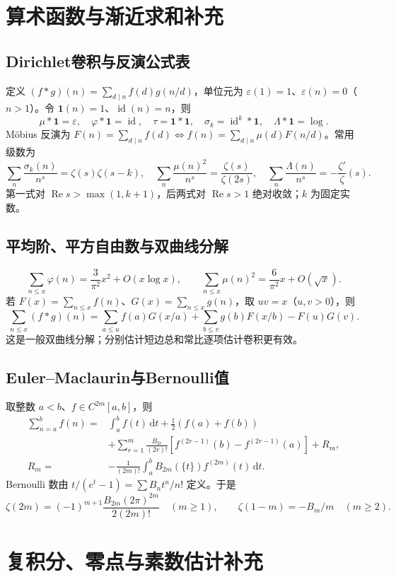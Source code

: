 \documentclass[../main.tex]{subfiles}
\begin{document}
\section{算术函数与渐近求和补充}
\subsection{Dirichlet卷积与反演公式表}
定义 $(f*g)(n)=\sum_{d\mid n}f(d)g(n/d)$，单位元为 $\varepsilon(1)=1$、$\varepsilon(n)=0$（$n>1$）。令 $\mathbf1(n)=1$、$\operatorname{id}(n)=n$，则
\[
\mu*\mathbf1=\varepsilon,\quad\varphi*\mathbf1=\operatorname{id},\quad
\tau=\mathbf1*\mathbf1,\quad\sigma_k=\operatorname{id}^k*\mathbf1,\quad
\Lambda*\mathbf1=\log.
\]
Möbius 反演为 $F(n)=\sum_{d\mid n}f(d)\iff f(n)=\sum_{d\mid n}\mu(d)F(n/d)$。常用级数为
\[
\sum_n\frac{\sigma_k(n)}{n^s}=\zeta(s)\zeta(s-k),\quad
\sum_n\frac{\mu(n)^2}{n^s}=\frac{\zeta(s)}{\zeta(2s)},\quad
\sum_n\frac{\Lambda(n)}{n^s}=-\frac{\zeta'}\zeta(s).
\]
第一式对 $\operatorname{Re}s>\max(1,k+1)$，后两式对 $\operatorname{Re}s>1$ 绝对收敛；$k$ 为固定实数。
\subsection{平均阶、平方自由数与双曲线分解}
\[
\sum_{n\le x}\varphi(n)=\frac3{\pi^2}x^2+O(x\log x),\qquad
\sum_{n\le x}\mu(n)^2=\frac6{\pi^2}x+O(\sqrt x).
\]
若 $F(x)=\sum_{n\le x}f(n)$、$G(x)=\sum_{n\le x}g(n)$，取 $uv=x$（$u,v>0$），则
\[
\sum_{n\le x}(f*g)(n)=\sum_{a\le u}f(a)G(x/a)+\sum_{b\le v}g(b)F(x/b)-F(u)G(v).
\]
这是一般双曲线分解；分别估计短边总和常比逐项估计卷积更有效。
\subsection{Euler--Maclaurin与Bernoulli值}
取整数 $a<b$、$f\in C^{2m}[a,b]$，则
\begin{align*}
\sum_{n=a}^bf(n)={}&\int_a^bf(t)\,\mathrm dt+\tfrac12(f(a)+f(b))\\
&+\sum_{r=1}^m\frac{B_{2r}}{(2r)!}[f^{(2r-1)}(b)-f^{(2r-1)}(a)]+R_m,\\
R_m={}&-\frac1{(2m)!}\int_a^b B_{2m}(\{t\})f^{(2m)}(t)\,\mathrm dt.
\end{align*}
Bernoulli 数由 $t/(e^t-1)=\sum B_nt^n/n!$ 定义。于是
\[
\zeta(2m)=(-1)^{m+1}\frac{B_{2m}(2\pi)^{2m}}{2(2m)!}\quad(m\ge1),\qquad
\zeta(1-m)=-B_m/m\quad(m\ge2).
\]
\section{复积分、零点与素数估计补充}
\end{document}
